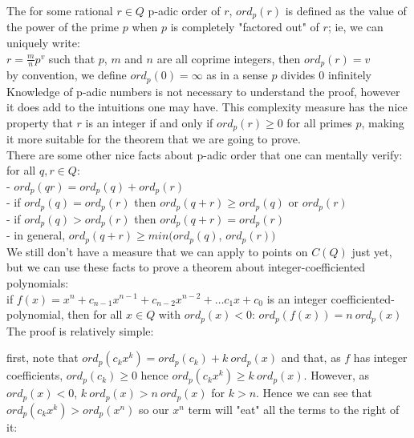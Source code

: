 \documentclass{article}
\begin{document}
The for some rational $r \in Q$ p-adic order of $r$, $ord_p(r)$ is defined as the value of the power of the prime $p$ when $p$ is completely "factored out" of $r$; ie, we can uniquely write:\\

$r = \frac{m}{n}p^v$ such that $p$, $m$ and $n$ are all coprime integers, then $ord_p(r) = v$\\

by convention, we define $ord_p(0) = \infty$ as in a sense $p$ divides $0$ infinitely\\

Knowledge of p-adic numbers is not necessary to understand the proof, however it does add to the intuitions one may have. This complexity measure has the nice property that $r$ is an integer if and only if $ord_p(r) \geq 0$ for all primes $p$, making it more suitable for the theorem that we are going to prove. \\

There are some other nice facts about p-adic order that one can mentally verify:\\

for all $q, r \in Q$:\\

- $ord_p(qr) = ord_p(q) + ord_p(r)$\\

- if $ord_p(q) = ord_p(r)$ then $ord_p(q + r)  \geq ord_p(q)$ or $ord_p(r)$\\

- if $ord_p(q) > ord_p(r)$ then $ord_p(q + r) = ord_p(r)$\\

- in general, $ord_p(q + r) \geq min(ord_p(q)$, $ord_p(r))$\\

We still don't have a measure that we can apply to points on $C(Q)$ just yet, but we can use these facts to prove a theorem about integer-coefficiented polynomials:\\

if $f(x) = x^n + c_{n-1}x^{n-1} + c_{n-2}x^{n-2} + \dots c_1 x + c_0$ is an integer coefficiented-polynomial, then for all $x \in Q$ with $ord_p(x) < 0$: $ord_p(f(x)) = n \ ord_p(x)$\\

The proof is relatively simple:

first, note that $ord_p(c_k x^k) = ord_p(c_k) + k \ ord_p(x)$ and that, as $f$ has integer coefficients, $ord_p(c_k) \geq 0$ hence $ord_p(c_k x^k) \geq k \ ord_p(x)$. However, as $ord_p(x) < 0$, $k \ ord_p(x) > n \ ord_p(x)$ for $k > n$. Hence we can see that $ord_p(c_k x^k) > ord_p(x^n)$ so our $x^n$ term will "eat" all the terms to the right of it:\\
\end{document}
